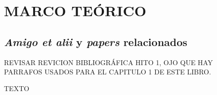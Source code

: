 
\chapter{MARCO TEÓRICO}\label{Marco Teorico}
\section{\textit{Amigo et alii} y \textit{papers} relacionados}

REVISAR REVICION BIBLIOGRÁFICA HITO 1, OJO QUE HAY PARRAFOS USADOS PARA EL CAPITULO 1 DE ESTE LIBRO.


\label{c2} %




TEXTO
